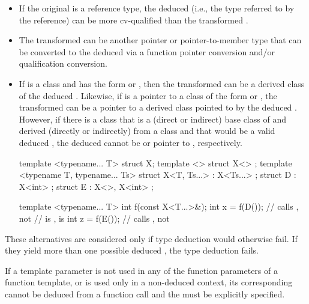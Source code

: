 \begin{itemize}
\item
If the original
is a reference type, the deduced
(i.e.,
the type referred to by the reference) can be more cv-qualified than
the transformed .
\item
The transformed 
can be another pointer or pointer-to-member type that can be converted
to the deduced
via a function pointer conversion and/or
qualification conversion.

\item
If
is a class and
has the form
 or
 ,
then
the transformed 
can be a derived class  of the
deduced
.
Likewise, if
is a pointer to a class of the form
 or
 ,
the transformed 
can be a pointer to a
derived class  pointed to by the deduced
.
However, if there is a class  that is
a (direct or indirect) base class of  and
derived (directly or indirectly) from a class  and
that would be a valid deduced ,
the deduced  cannot be  or pointer to ,
respectively.
\begin{example}
\begin{codeblock}
template <typename... T> struct X;
template <> struct X<> {};
template <typename T, typename... Ts>
  struct X<T, Ts...> : X<Ts...> {};
struct D : X<int> {};
struct E : X<>, X<int> {};

template <typename... T>
int f(const X<T...>&);
int x = f(D());     // calls , not 
                    //  is ,  is 
int z = f(E());     // calls , not 
\end{codeblock}
\end{example}
\end{itemize}

\pnum
These alternatives are considered only if type deduction would
otherwise fail.
If they yield more than one possible deduced
,
the type deduction fails.
\begin{note}
If a template parameter
is not used in any of the function parameters of a function template,
or is used only in a non-deduced context, its corresponding
cannot be deduced from a function call and the
must be explicitly specified.
\end{note}

